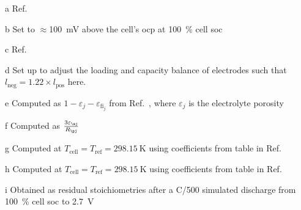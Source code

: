 \begin{table}[!htbp]
\begin{threeparttable}
        \begin{tablenotes}[para]
            \begin{footnotesize}
            \item[a] Ref.~\cite{Northrop2011}
		    \item[b] Set to $\approx $\SI{100}{\milli\volt} above the cell's \gls{ocp} at \SI{100}{\percent} cell \gls{soc}
		    \item[c] Ref.~\cite{Subramanian2009}
		    \item[d] Set up to adjust the loading and capacity balance of electrodes such that $l_\text{neg} = 1.22 \times l_\text{pos}$ here.
		    \item[e] Computed as $1-\varepsilon_j - \varepsilon_{\text{fi}_j}$ from Ref.~\cite{Subramanian2009}, where $\varepsilon_j$ is the electrolyte porosity\\
		    \item[f] Computed as $\frac{3 \varepsilon_\sj}{R_\pj}$
		    \item[g] Computed at $T_\text{cell} = T_\text{ref} = \SI{298.15}{\kelvin}$ using coefficients from table  in Ref.~\cite{Valoen2005}
		    \item[h] Computed at $T_\text{cell} = T_\text{ref} = \SI{298.15}{\kelvin}$ using coefficients from table  in Ref.~\cite{Valoen2005}\\
            \item[i] Obtained as residual stoichiometries after a C/\num{500} simulated discharge from \SI{100}{\percent} cell \gls{soc} to \SI{2.7}{V}


\end{footnotesize}
\end{tablenotes}
\end{threeparttable}
\end{table}

